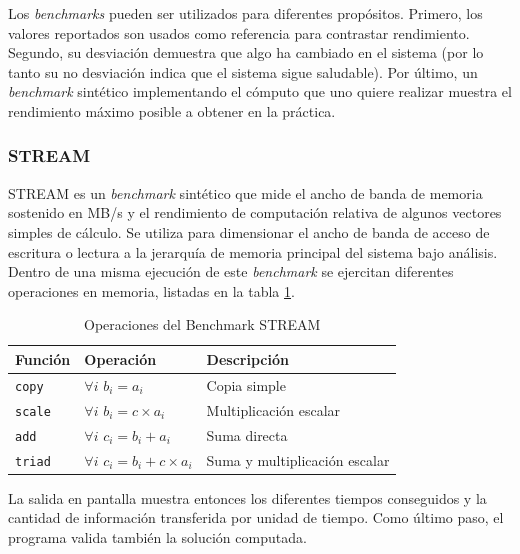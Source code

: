 \documentclass[a4paper]{report}
\begin{document}
\bigskip

Los {\it benchmarks} pueden ser utilizados para diferentes propósitos. Primero, los valores reportados son usados como referencia para contrastar rendimiento.
Segundo, su desviación demuestra que algo ha cambiado en el sistema (por lo tanto su no desviación indica que el sistema sigue saludable). Por último,
un {\it benchmark} sintético implementando el cómputo que uno quiere realizar muestra el rendimiento máximo posible a obtener en la práctica.

\subsubsection{STREAM}

STREAM \cite{stream} es un {\it benchmark} sintético que mide el ancho de banda de memoria sostenido en MB/s y el rendimiento de computación relativa de algunos vectores simples de cálculo. Se utiliza para dimensionar el ancho de banda de acceso de escritura o lectura a la jerarquía de memoria principal del sistema bajo análisis. Dentro de una misma ejecución de este {\it benchmark} se ejercitan diferentes operaciones en memoria, listadas en la tabla \ref{table:stream}.

\begin{table}[H]
\caption{Operaciones del Benchmark STREAM}
  \centering
    \begin{tabular}{|l|l|l|}\hline
      {\bf Función} & {\bf Operación} & {\bf Descripción} \\ \hline
      {\tt copy} & $ \forall i $ $ b_{i} = a_{i} $ & Copia simple \\ \hline
      {\tt scale} & $ \forall i $ $ b_{i} = c \times a_{i} $ & Multiplicación escalar \\ \hline
      {\tt add} & $ \forall i $ $ c_{i} = b_{i} + a_{i} $ & Suma directa \\ \hline
      {\tt triad} & $ \forall i $ $ c_{i} = b_{i} + c \times a_{i} $ & Suma y multiplicación escalar \\ \hline
    \end{tabular} 
 \label{table:stream}
\end{table}

La salida en pantalla muestra entonces los diferentes tiempos conseguidos y la cantidad de información transferida por unidad de tiempo.
Como último paso, el programa valida también la solución computada.
\end{document}
